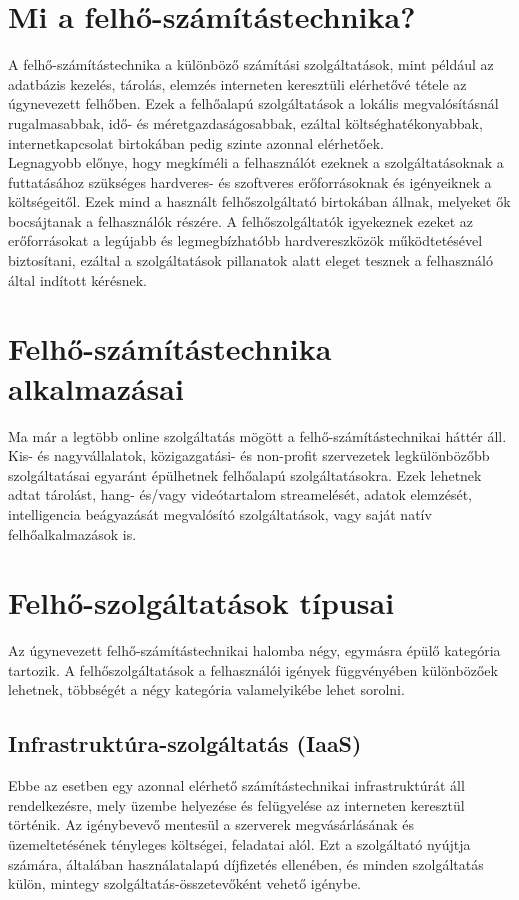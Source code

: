 \documentclass[12pt]{report}
\begin{document}
\section{Mi a felhő-számítástechnika?}
A felhő-számítástechnika a különböző számítási szolgáltatások, mint például az adatbázis kezelés, tárolás, elemzés interneten keresztüli elérhetővé tétele az úgynevezett felhőben. Ezek a felhőalapú szolgáltatások a lokális megvalósításnál rugalmasabbak, idő- és méretgazdaságosabbak, ezáltal költséghatékonyabbak, internetkapcsolat birtokában pedig szinte azonnal elérhetőek.\\
Legnagyobb előnye, hogy megkíméli a felhasználót ezeknek a szolgáltatásoknak a futtatásához szükséges hardveres- és szoftveres erőforrásoknak és igényeiknek a költségeitől. Ezek mind a használt felhőszolgáltató birtokában állnak, melyeket ők bocsájtanak a felhasználók részére. A felhőszolgáltatók igyekeznek ezeket az erőforrásokat a legújabb és legmegbízhatóbb hardvereszközök működtetésével biztosítani, ezáltal a szolgáltatások pillanatok alatt eleget tesznek a felhasználó által indított kérésnek.

\section{Felhő-számítástechnika alkalmazásai}
Ma már a legtöbb online szolgáltatás mögött a felhő-számítástechnikai háttér áll. Kis- és nagyvállalatok, közigazgatási- és non-profit szervezetek legkülönbözőbb szolgáltatásai egyaránt épülhetnek felhőalapú szolgáltatásokra. Ezek lehetnek adtat tárolást, hang- és/vagy videótartalom streamelését, adatok elemzését, intelligencia beágyazását megvalósító szolgáltatások, vagy saját natív felhőalkalmazások is.

\section{Felhő-szolgáltatások típusai}
Az úgynevezett felhő-számítástechnikai halomba négy, egymásra épülő kategória tartozik. A felhőszolgáltatások a felhasználói igények függvényében különbözőek lehetnek, többségét a négy kategória valamelyikébe lehet sorolni.
\subsection{Infrastruktúra-szolgáltatás (IaaS)}
Ebbe az esetben egy azonnal elérhető számítástechnikai infrastruktúrát áll rendelkezésre, mely üzembe helyezése és felügyelése az interneten keresztül történik. Az igénybevevő mentesül a szerverek megvásárlásának és üzemeltetésének tényleges költségei, feladatai alól. Ezt a szolgáltató nyújtja számára, általában használatalapú díjfizetés ellenében, és minden szolgáltatás külön, mintegy szolgáltatás-összetevőként vehető igénybe.
\end{document}
